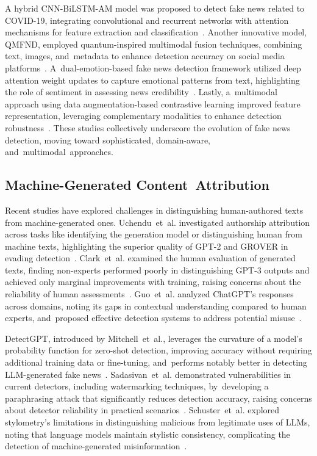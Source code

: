 \documentclass[electronics,article,accept,pdftex,moreauthors,electronics]{Definitions/mdpi}
\begin{document}
A hybrid CNN-BiLSTM-AM model was proposed to detect fake news related to COVID-19, integrating convolutional and recurrent networks with attention mechanisms for feature extraction and classification~\cite{xia_covid-19_2023}. Another innovative model, QMFND, employed quantum-inspired multimodal fusion techniques, combining text, images, and~metadata to enhance detection accuracy on social media platforms~\cite{qu_qmfnd_2024}. A~dual-emotion-based fake news detection framework utilized deep attention weight updates to capture emotional patterns from text, highlighting the role of sentiment in assessing news credibility~\cite{luvembe_dual_2023}. Lastly, a~multimodal approach using data augmentation-based contrastive learning improved feature representation, leveraging complementary modalities to enhance detection robustness~\cite{hua_multimodal_2023}. These studies collectively underscore the evolution of fake news detection, moving toward sophisticated, domain-aware, and~multimodal~approaches.

\subsection{Machine-Generated Content~Attribution}

Recent studies have explored challenges in distinguishing human-authored texts from machine-generated ones. Uchendu~et~al. investigated authorship attribution across tasks like identifying the generation model or distinguishing human from machine texts, highlighting the superior quality of GPT-2 and GROVER in evading detection~\cite{uchendu_authorship_2020}. Clark~et~al. examined the human evaluation of generated texts, finding non-experts performed poorly in distinguishing GPT-3 outputs and achieved only marginal improvements with training, raising concerns about the reliability of human assessments~\cite{clark_all_2021}. Guo~et~al. analyzed ChatGPT's responses across domains, noting its gaps in contextual understanding compared to human experts, and~proposed effective detection systems to address potential misuse~\cite{guo_how_2023}.

DetectGPT, introduced by Mitchell~et~al., leverages the curvature of a model’s probability function for zero-shot detection, improving accuracy without requiring additional training data or fine-tuning, and~performs notably better in detecting LLM-generated fake news~\cite{mitchell_detectgpt_2023}. Sadasivan~et~al. demonstrated vulnerabilities in current detectors, including watermarking techniques, by~developing a paraphrasing attack that significantly reduces detection accuracy, raising concerns about detector reliability in practical scenarios~\cite{sadasivan_can_2024}. Schuster~et~al. explored stylometry’s limitations in distinguishing malicious from legitimate uses of LLMs, noting that language models maintain stylistic consistency, complicating the detection of machine-generated misinformation~\cite{schuster_limitations_2020}.
\end{document}
